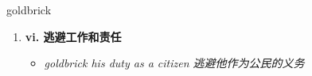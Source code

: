 
\begin{frame}
{\huge goldbrick}
\begin{center}
\begin{enumerate}\Large
  \item \textbf{vi. 逃避工作和责任}
  \begin{itemize}
    \item \em{\Large{goldbrick his duty as a citizen 逃避他作为公民的义务}}
  \end{itemize}
\end{enumerate}
\end{center}
\end{frame}
